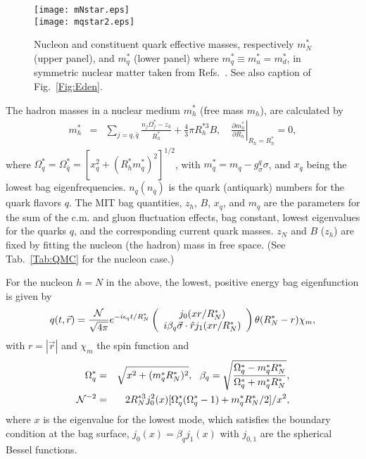 \documentclass[preprint,aps,showpacs,floatfix]{revtex4}
\def\qbar{\bar{q}}
\def\Qbar{\overline{Q}}
\begin{document}
\begin{figure}[tb]
\begin{center}
\texttt{[image: mNstar.eps]}
\\
\vspace*{1.5cm}
\texttt{[image: mqstar2.eps]}
\caption{Nucleon and constituent quark effective masses, respectively $m^*_N$ (upper panel), 
and $m^*_q$ (lower panel) where $m^*_q \equiv m^*_u = m^*_d$, in symmetric nuclear 
matter taken from Refs.~\cite{pimedium1,pimedium2,pimedium3,pimedium4}. 
See also caption of Fig.~\ref{Fig:Eden}.
\label{Fig:mNmqstar}
}
\end{center}
\end{figure}




The hadron masses
in a nuclear medium $m^*_h$ (free mass $m_h$),
are calculated by
%
\begin{eqnarray}
m_h^* &=& \sum_{j=q,\bar{q}}
\frac{ n_j\Omega_j^* - z_h}{R_h^*}
+ \frac{4}{3}\pi R_h^{* 3} B,\quad
\left. \frac{\partial m_h^*}
{\partial R_h}\right|_{R_h = R_h^*} = 0,
\label{hmass}
\end{eqnarray}
%
where $\Omega_q^*=\Omega_{\bar{q}}^*
=[x_q^2 + (R_h^* m_q^*)^2]^{1/2}$, with
$m_q^*=m_q{-}g^q_\sigma \sigma$,
and $x_{q}$ being the lowest bag eigenfrequencies.
$n_q (n_{\qbar})$ 
is the quark (antiquark)
numbers for the quark flavors $q$.
The MIT bag quantities, $z_h$, $B$, $x_q$,
and $m_q$ are the parameters for the sum of the c.m. and gluon
fluctuation effects, bag constant, lowest eigenvalues for the quarks
$q$, and the corresponding current quark masses.
$z_N$ and $B$ ($z_h$) are fixed by fitting the nucleon
(the hadron) mass in free space. (See Tab.~\ref{Tab:QMC} for the nucleon case.)

For the nucleon $h=N$ in the above, the lowest, positive energy bag eigenfunction is given by
%
\begin{equation}
q(t,\vec{r}) = \frac{\cal N}{\sqrt{4\pi}}
e^{-i\epsilon_qt/R^*_N}\left( \begin{array}{c}
j_0(xr/R^*_N) \\
i\beta_q {\vec \sigma}\cdot{\hat r} j_1(xr/R^*_N)
\end{array} \right) \theta(R^*_N-r) \chi_m ,
\label{lowest}
\end{equation}
%
with $r=|\vec{r}|$ and $\chi_m$ the spin function and
%
\begin{eqnarray}
\Omega_q^* &=& \sqrt{x^2+(m_q^\ast R^*_N)^2}, \ \
\beta_q = \sqrt{\frac{\Omega_q^* - m_q^\ast R^*_N}{\Omega_q^* + m_q^\ast R^*_N}} ,
\label{omega0} \\
{\cal N}^{-2} &=& 2R_N^{*3} j_0^2(x)[\Omega_q^*(\Omega_q^*-1) + m_q^\ast R^*_N/2]/x^2  ,
\label{norm}
\end{eqnarray}
%
where $x$ is the eigenvalue for the lowest mode,
which satisfies the boundary condition at the bag surface,
$j_0(x) = \beta_q j_1(x)$ with $j_{0,1}$ are the spherical Bessel functions.
\end{document}

